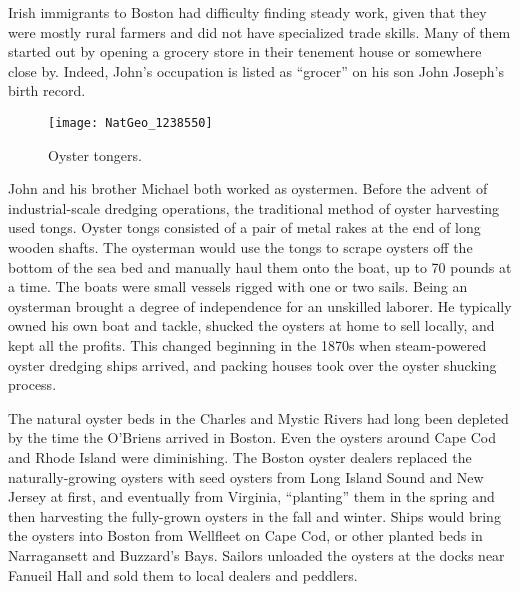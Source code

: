 Irish immigrants to Boston had difficulty finding steady work, given that they were mostly rural farmers and did not have specialized trade skills.\cite{Ryan:21} Many of them started out by opening a grocery store in their tenement house or somewhere close by.\cite{Ryan:83} Indeed, John's occupation is listed as ``grocer'' on his son John Joseph's birth record.\cite{John3OBrienBirth:1} 

\begin{figure}
	\centering
	\texttt{[image: NatGeo\_1238550]}
	\caption{Oyster tongers.}
	\label{fig:OysterTongers}
\end{figure}

John and his brother Michael both worked as oystermen.\cite{oysters} Before the advent of industrial-scale dredging operations, the traditional method of oyster harvesting used tongs. Oyster tongs consisted of a pair of metal rakes at the end of long wooden shafts. The oysterman would use the tongs to scrape oysters off the bottom of the sea bed and manually haul them onto the boat, up to 70 pounds at a time. The boats were small vessels rigged with one or two sails.\cite{Botwick:95} Being an oysterman brought a degree of independence for an unskilled laborer. He typically owned his own boat and tackle, shucked the oysters at home to sell locally, and kept all the profits.\cite{MacKenzie:7:1} This changed beginning in the 1870s when steam-powered oyster dredging ships arrived, and packing houses took over the oyster shucking process.\cite{MacKenzie:5} 

The natural oyster beds in the Charles and Mystic Rivers had long been depleted by the time the O'Briens arrived in Boston. Even the oysters around Cape Cod and Rhode Island were diminishing. The Boston oyster dealers replaced the naturally-growing oysters with seed oysters from Long Island Sound and New Jersey at first, and eventually from Virginia, ``planting'' them in the spring and then harvesting the fully-grown oysters in the fall and winter. Ships would bring the oysters into Boston from Wellfleet on Cape Cod, or other planted beds in Narragansett and Buzzard's Bays. Sailors unloaded the oysters at the docks near Fanueil Hall and sold them to local dealers and peddlers.\cite{Ingersoll:27-28} 


